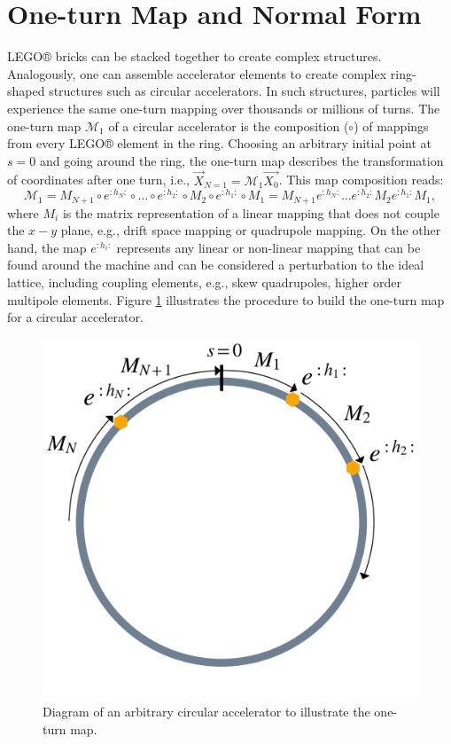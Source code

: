 \section{\label{sec:oneturn}One-turn Map and Normal Form}

LEGO® bricks can be stacked together to create complex structures. Analogously, one can assemble accelerator elements to create complex ring-shaped structures such as circular accelerators. In such structures, particles will experience the same one-turn mapping over thousands or millions of turns. The one-turn map $\mathcal{M}_1$ of a circular accelerator is the composition ($\circ$) of mappings from every LEGO® element in the ring. Choosing an arbitrary initial point at $s=0$ and going around the ring, the one-turn map describes the transformation of coordinates after one turn, i.e., $\vec{X}_{N=1}=\mathcal{M}_1 \vec{X_0}$. This map composition reads:
\begin{equation}
    \label{eq:oneturnmap}
    \mathcal{M}_1=M_{N+1} \circ e^{:h_N:} \circ \dots \circ e^{:h_2:} \circ M_2 \circ e^{:h_1:} \circ M_1 = M_{N+1}e^{:h_N:} \dots e^{:h_2:}M_2 e^{:h_1:}M_1,
\end{equation}
where $M_i$ is the matrix representation of a linear mapping that does not couple the $x-y$ plane, e.g., drift space mapping or quadrupole mapping. On the other hand, the map $e^{:h_i:}$ represents any linear or non-linear mapping that can be found around the machine and can be considered a perturbation to the ideal lattice, including coupling elements, e.g., skew quadrupoles, higher order multipole elements. Figure \ref{fig:oneturn} illustrates the procedure to build the one-turn map for a circular accelerator. 

\begin{figure}[H]
    \centering
    \includegraphics[width=0.7\columnwidth]{chapter2/oneturn.png}
    \caption{Diagram of an arbitrary circular accelerator to illustrate the one-turn map.}
    \label{fig:oneturn}
 \end{figure}

